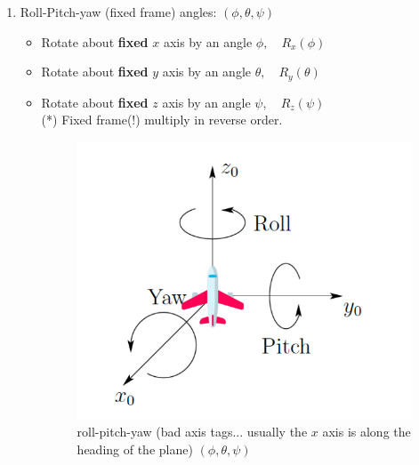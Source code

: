 \documentclass{article}
\begin{document}
\begin{itemize}
\begin{enumerate}
 \item Roll-Pitch-yaw (fixed frame) angles: $(\phi, \theta, \psi)$
 \begin{itemize}
     \item Rotate about \textbf{fixed} $x$ axis by an angle $\phi, \quad R_{x}(\phi)$
     \item Rotate about \textbf{fixed} $y$ axis by an angle $\theta, \quad R_{y}(\theta)$
     \item Rotate about \textbf{fixed} $z$ axis by an angle $\psi, \quad R_{z}(\psi)$ \\
(*) Fixed frame(!) multiply in reverse order.      
    \begin{figure}[h!]
    \centering
    \includegraphics[scale=1.5]{rollPitchYaw.png}
    \caption{roll-pitch-yaw (bad axis tags... usually the $x$ axis is along the heading of the plane) $(\phi, \theta,\psi)$}
    \label{fig:sr}
    \end{figure}
    

\end{itemize}
\end{enumerate}
\end{itemize}
\end{document}

